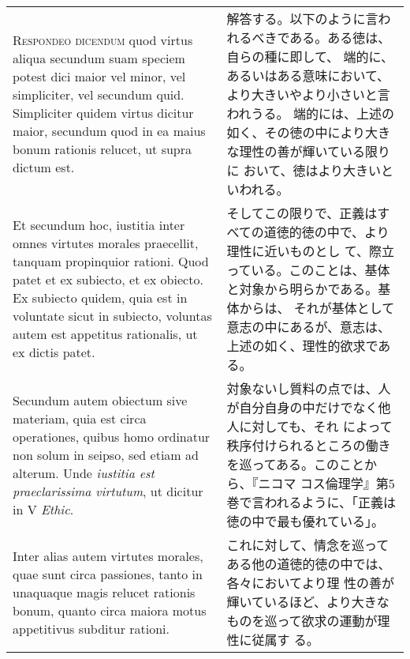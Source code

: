 \documentclass[10pt]{jsarticle}
\begin{document}
\begin{longtable}{p{21em}p{21em}}
\\



{\scshape Respondeo dicendum} quod virtus aliqua secundum suam speciem
potest dici maior vel minor, vel simpliciter, vel secundum
quid. Simpliciter quidem virtus dicitur maior, secundum quod in ea
maius bonum rationis relucet, ut supra dictum est.


&

解答する。以下のように言われるべきである。ある徳は、自らの種に即して、
端的に、あるいはある意味において、より大きいやより小さいと言われうる。
端的には、上述の如く、その徳の中により大きな理性の善が輝いている限りに
おいて、徳はより大きいといわれる。

\\



Et secundum hoc, iustitia inter omnes
virtutes morales praecellit, tanquam propinquior rationi. Quod patet
et ex subiecto, et ex obiecto. Ex subiecto quidem, quia est in
voluntate sicut in subiecto, voluntas autem est appetitus rationalis,
ut ex dictis patet.


&

そしてこの限りで、正義はすべての道徳的徳の中で、より理性に近いものとし
て、際立っている。このことは、基体と対象から明らかである。基体からは、
それが基体として意志の中にあるが、意志は、上述の如く、理性的欲求である。

\\



Secundum autem obiectum sive materiam, quia est circa operationes,
quibus homo ordinatur non solum in seipso, sed etiam ad alterum. Unde
{\itshape iustitia est praeclarissima virtutum}, ut dicitur in V
{\itshape Ethic}. 


&

対象ないし質料の点では、人が自分自身の中だけでなく他人に対しても、それ
によって秩序付けられるところの働きを巡ってある。このことから、『ニコマ
コス倫理学』第5巻で言われるように、「正義は徳の中で最も優れている」。

\\


Inter alias autem virtutes morales, quae sunt circa
passiones, tanto in unaquaque magis relucet rationis bonum, quanto
circa maiora motus appetitivus subditur rationi.

&



これに対して、情念を巡ってある他の道徳的徳の中では、各々においてより理
性の善が輝いているほど、より大きなものを巡って欲求の運動が理性に従属す
る。



\end{longtable}
\end{document}

